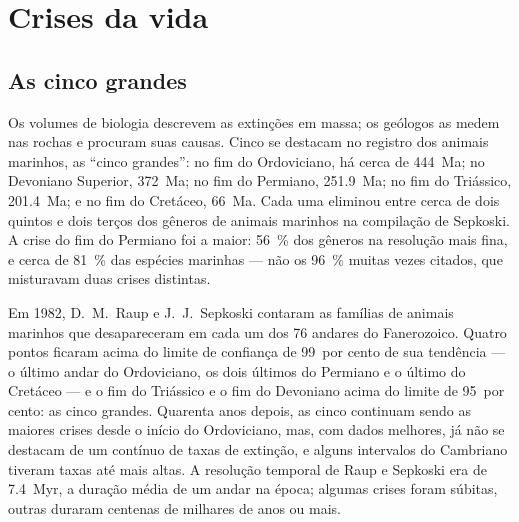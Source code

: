 \section{Crises da vida}\label{sec:b2:phanerozoic-earth:extinctions}

\subsection*{As cinco grandes}

Os volumes de biologia descrevem as extinções em massa; os geólogos as medem nas rochas e procuram
suas causas. Cinco se destacam no registro dos animais marinhos, as ``cinco grandes'': no fim do
Ordoviciano, há cerca de \qty{444}{Ma}; no Devoniano Superior, \qty{372}{Ma}; no fim do Permiano,
\qty{251.9}{Ma}; no fim do Triássico, \qty{201.4}{Ma}; e no fim do Cretáceo,
\qty{66}{Ma}. Cada uma eliminou entre cerca de dois quintos e dois terços dos gêneros de animais
marinhos na compilação de Sepkoski. A crise do fim do Permiano foi a maior: \qty{56}{\percent} dos
gêneros na resolução mais fina, e cerca de \qty{81}{\percent} das espécies marinhas --- não os
\qty{96}{\percent} muitas vezes citados, que misturavam duas crises distintas.

\begin{history}
Em 1982, D.~M.~Raup e J.~J.~Sepkoski contaram as famílias de animais marinhos que desapareceram
em cada um dos 76 andares do Fanerozoico. Quatro pontos ficaram acima do limite de confiança de 99~por cento
de sua tendência --- o último andar do Ordoviciano, os dois últimos do Permiano e o último do
Cretáceo --- e o fim do Triássico e o fim do Devoniano acima do limite de 95~por cento:
as cinco grandes. Quarenta anos depois, as cinco continuam sendo as maiores crises desde o início do
Ordoviciano, mas, com dados melhores, já não se destacam de um contínuo de taxas de
extinção, e alguns intervalos do Cambriano tiveram taxas até mais altas. A resolução temporal de Raup e Sepkoski
era de \qty{7.4}{Myr}, a duração média de um andar na época; algumas crises foram súbitas, outras
duraram centenas de milhares de anos ou mais.
\end{history}

